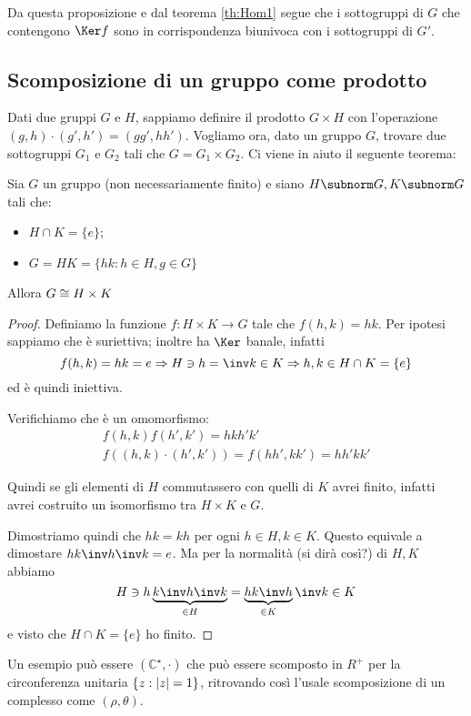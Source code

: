 \documentclass[a4paper,10pt,oneside]{math_article}
\begin{document}
      Da questa proposizione e dal teorema \ref{th:Hom1} segue che i sottogruppi di $G$ che contengono $\Ker f$ sono in corrispondenza biunivoca con i sottogruppi di $G'$.
      
      \subsection{Scomposizione di un gruppo come prodotto}

      Dati due gruppi $G$ e $H$, sappiamo definire il prodotto $G \times H$ con l'operazione $(g,h)\cdot (g',h')=(gg',hh')$. Vogliamo ora, dato un gruppo $G$, trovare due sottogruppi $G_1$ e $G_2$ tali che $G=G_1\times G_2$. Ci viene in aiuto il seguente teorema:
      
      \begin{mytheorem}
	Sia $G$ un gruppo (non necessariamente finito) e siano $H\subnorm G, K \subnorm G$ tali che:
	\begin{itemize}
	 \item $H\cap K=\{e\}$;
	 \item $G = HK = \{hk: h\in H, g \in G\}$
	\end{itemize}
	Allora $G \cong H\times K$
      \end{mytheorem}
      \begin{proof}
	Definiamo la funzione $f: H\times K \rightarrow G$ tale che $f(h,k)=hk$. Per ipotesi sappiamo che è suriettiva; inoltre ha $\Ker$ banale, infatti 
	\[f(h,k)=hk=e \Rightarrow H \ni h = \inv k \in K \Rightarrow h,k \in H \cap K = \{e\} \]
	ed è quindi iniettiva.
	
	Verifichiamo che è un omomorfismo: 
	\begin{gather*}
	  f(h,k)f(h',k')=hkh'k' \\
	  f\left((h,k)\cdot(h',k')\right)=f(hh',kk')=hh'kk'
	\end{gather*}
      
	Quindi se gli elementi di $H$ commutassero con quelli di $K$ avrei finito, infatti avrei costruito un isomorfismo tra $H\times K$ e $G$.
	
	Dimostriamo quindi che $hk=kh$ per ogni $ h\in H, k \in K$. Questo equivale a dimostare $hk\inv h\inv k=e$. Ma per la normalità (si dirà così?) di $H,K$ abbiamo
	\[
	H \ni h\underbrace{k\inv h \inv k}_{\in H} = \underbrace{hk\inv h}_{\in K}\inv k \in K
	\]
	e visto che $H\cap K=\{e\}$ ho finito.
      \end{proof}
      
      Un esempio può essere $(\mathbb C^\star, \cdot)$ che può essere scomposto in $R^+$ per la circonferenza unitaria $\{z:\left|z\right|=1\}$, ritrovando così l'usale scomposizione di un complesso come $(\rho,\theta)$.
      
      

      
\end{document}
